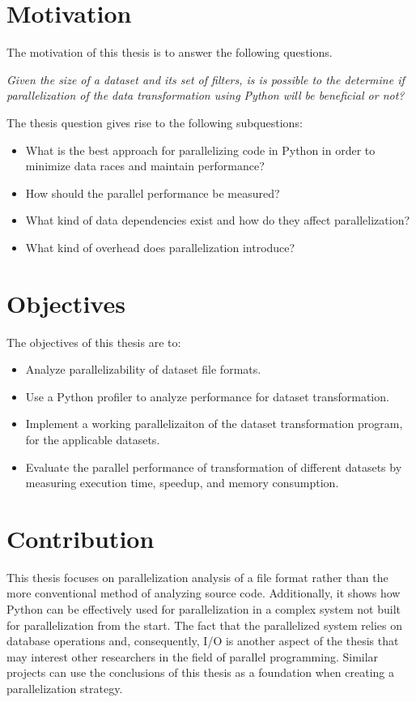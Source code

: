 \section{Motivation}
The motivation of this thesis is to answer the following questions.

\emph{Given the size of a dataset and its set of filters, is is possible to the determine 
if parallelization of the data transformation using Python will be beneficial or not?}

The thesis question gives rise to the following subquestions:
\begin{itemize}
    \item What is the best approach for parallelizing code in Python in order to minimize data races and maintain performance?
    \item How should the parallel performance be measured?
    \item What kind of data dependencies exist and how do they affect parallelization?
    \item What kind of overhead does parallelization introduce?
\end{itemize}

\section{Objectives}
The objectives of this thesis are to:
\begin{itemize}
    \item Analyze parallelizability of dataset file formats.
    \item Use a Python profiler to analyze  performance for dataset transformation.
    \item Implement a working parallelizaiton of the dataset transformation program, for the applicable datasets.
    \item Evaluate the parallel performance of transformation of different datasets by measuring execution time, speedup, and memory consumption.
\end{itemize}

\section{Contribution}
This thesis focuses on parallelization analysis of a file format rather than the more conventional method of analyzing source code. Additionally,
it shows how Python can be effectively used for parallelization in a complex system not built for parallelization from the start. The fact that
the parallelized system relies on database operations and, consequently, I/O is another aspect of the thesis that may interest other researchers
in the field of parallel programming. Similar projects can use the conclusions of this thesis as a foundation when creating a parallelization strategy.
